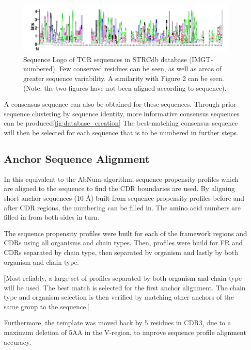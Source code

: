 \begin{figure}
    \centering
    \includegraphics[width=\textwidth,height=\textheight,keepaspectratio]{IMGT_logo.png}
    \caption{Sequence Logo of TCR sequences in STRCdb database (IMGT-numbered). Few conserved residues can be seen, as well as areas of greater sequence variability. A similarity with Figure 2 can be seen. (Note:  the two figures have not been aligned according to sequence).}
    \label{fig:IMGT_logo}
\end{figure}

A consensus sequence can also be obtained for these sequences. Through prior sequence clustering by sequence identity, more informative consensus sequences can be produced\ref{fig:database_creation} The best-matching consensus sequence will then be selected for each sequence that is to be numbered in further steps. 

\subsection{Anchor Sequence Alignment}
In this equivalent to the AbNum-algorithm, sequence propensity profiles which are aligned to the sequence to find the CDR boundaries are used. By aligning short anchor sequences (10 \AA) built from sequence propensity profiles before and after CDR regions, the numbering can be filled in. The amino acid numbers are filled in from both sides in turn.

The sequence propensity profiles were built for each of the framework regions and CDRs using all organisms and chain types. Then, profiles were build for FR and CDRs separated by chain type, then separated by organism and lastly by both organism and chain type. 

[Most reliably, a large set of profiles separated by both organism and chain type will be used. The best match is selected for the first anchor alignment. The chain type and organism selection is then verified by matching other anchors of the same group to the sequence.]

Furthermore, the template was moved back by 5 residues in CDR3, due to a maximum deletion of 5AA in the V-region, to improve sequence profile alignment accuracy.


